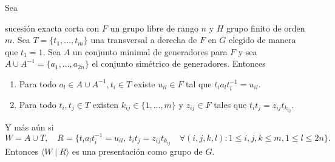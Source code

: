 \documentclass[tesis.tex]{subfiles}
\begin{document}
	\begin{prop}
		\label{prop:presentacion_vl}
		Sea  
		\begin{center}
		\end{center}
		sucesión exacta corta con $F$ un grupo libre de rango $n$ y $H$ grupo finito de orden $m$.
		Sea $T = \{ t_{1},\dots, t_{m} \}$ una transversal a derecha de $F$ en $G$ elegido de manera que $t_{1} = 1$.
		Sea $A$ un conjunto minimal de generadores para $F$ y sea $A \cup A^{-1} =  \{ a_{1}, \dots, a_{2n} \}$ el conjunto simétrico de generadores.
		Entonces
		\begin{enumerate}
			\item  Para todo $a_l \in A \cup A^{-1}, t_{i} \in T$ 
			existe $u_{il} \in F$ tal que $t_ia_{l}t_i^{-1} = u_{il}$.
			\item  Para todo $t_{i}, t_{j} \in T$ 
			existen $k_{ij} \in \{1, \dots, m \}$ y $z_{ij} \in F$ tales que 
			$t_it_j = z_{ij}t_{k_{ij}}$.
		\end{enumerate}
		Y más aún si
			\[
				W = A \cup T, \quad R = \{t_ia_{l}t_i^{-1} = u_{il}, \   t_it_j = z_{ij}t_{k_{ij}} \quad \forall (i,j,k,l) :   1 \le i,j,k \le m, 1 \le l  \le 2n \}.
			\]
		Entonces  $\langle W \mid R \rangle$ es una presentación como grupo de $G$.
	\end{prop}
	
\end{document}

